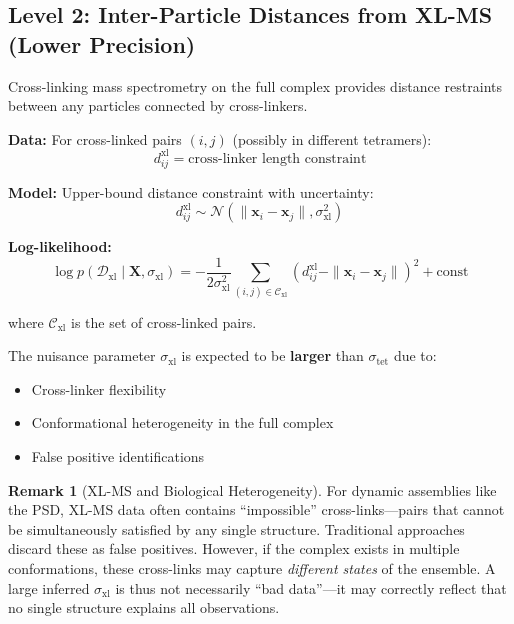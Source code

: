 \documentclass[11pt,a4paper]{article}
\newcommand{\bx}{\mathbf{x}}
\newcommand{\bX}{\mathbf{X}}
\newcommand{\Normal}{\mathcal{N}}
\theoremstyle{definition}
\newtheorem{remark}{Remark}
\begin{document}
\subsection{Level 2: Inter-Particle Distances from XL-MS (Lower Precision)}

Cross-linking mass spectrometry on the full complex provides distance restraints between any particles connected by cross-linkers.

\textbf{Data:} For cross-linked pairs $(i,j)$ (possibly in different tetramers):
\begin{equation}
    d_{ij}^{\text{xl}} = \text{cross-linker length constraint}
\end{equation}

\textbf{Model:} Upper-bound distance constraint with uncertainty:
\begin{equation}
    d_{ij}^{\text{xl}} \sim \Normal\left( \|\bx_i - \bx_j\|, \sigma_{\text{xl}}^2 \right)
\end{equation}

\textbf{Log-likelihood:}
\begin{equation}
    \log p(\mathcal{D}_{\text{xl}} \mid \bX, \sigma_{\text{xl}}) = 
    -\frac{1}{2\sigma_{\text{xl}}^2} \sum_{(i,j) \in \mathcal{C}_{\text{xl}}} 
    \left( d_{ij}^{\text{xl}} - \|\bx_i - \bx_j\| \right)^2 + \text{const}
\end{equation}

where $\mathcal{C}_{\text{xl}}$ is the set of cross-linked pairs.

The nuisance parameter $\sigma_{\text{xl}}$ is expected to be \textbf{larger} than $\sigma_{\text{tet}}$ due to:
\begin{itemize}
    \item Cross-linker flexibility
    \item Conformational heterogeneity in the full complex
    \item False positive identifications
\end{itemize}

\begin{remark}[XL-MS and Biological Heterogeneity]
For dynamic assemblies like the PSD, XL-MS data often contains ``impossible'' cross-links---pairs that cannot be simultaneously satisfied by any single structure. Traditional approaches discard these as false positives. However, if the complex exists in multiple conformations, these cross-links may capture \textit{different states} of the ensemble. A large inferred $\sigma_{\text{xl}}$ is thus not necessarily ``bad data''---it may correctly reflect that no single structure explains all observations.
\end{remark}
\end{document}
